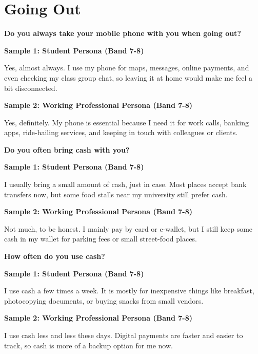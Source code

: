 \newpage

\section{Going Out}
\begin{ieltsquestion}
\textbf{Do you always take your mobile phone with you when going out?}
\end{ieltsquestion}
\textbf{Sample 1: Student Persona (Band 7-8)}

Yes, almost always. I use my phone for maps, messages, online payments, and even checking my class group chat, so leaving it at home would make me feel a bit disconnected.

\textbf{Sample 2: Working Professional Persona (Band 7-8)}

Yes, definitely. My phone is essential because I need it for work calls, banking apps, ride-hailing services, and keeping in touch with colleagues or clients.

\separator

\begin{ieltsquestion}
\textbf{Do you often bring cash with you?}
\end{ieltsquestion}
\textbf{Sample 1: Student Persona (Band 7-8)}

I usually bring a small amount of cash, just in case. Most places accept bank transfers now, but some food stalls near my university still prefer cash.

\textbf{Sample 2: Working Professional Persona (Band 7-8)}

Not much, to be honest. I mainly pay by card or e-wallet, but I still keep some cash in my wallet for parking fees or small street-food places.

\separator

\begin{ieltsquestion}
\textbf{How often do you use cash?}
\end{ieltsquestion}
\textbf{Sample 1: Student Persona (Band 7-8)}

I use cash a few times a week. It is mostly for inexpensive things like breakfast, photocopying documents, or buying snacks from small vendors.

\textbf{Sample 2: Working Professional Persona (Band 7-8)}

I use cash less and less these days. Digital payments are faster and easier to track, so cash is more of a backup option for me now.

\separator

